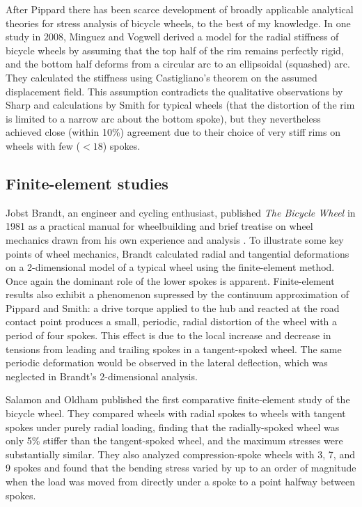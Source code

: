 \documentclass[../thesis.tex]{subfiles}
\begin{document}
After Pippard there has been scarce development of broadly applicable analytical theories for stress analysis of bicycle wheels, to the best of my knowledge. In one study in 2008, Minguez and Vogwell \cite{MinguezVogwell} derived a model for the radial stiffness of bicycle wheels by assuming that the top half of the rim remains perfectly rigid, and the bottom half deforms from a circular arc to an ellipsoidal (squashed) arc. They calculated the stiffness using Castigliano's theorem on the assumed displacement field. This assumption contradicts the qualitative observations by Sharp and calculations by Smith for typical wheels (that the distortion of the rim is limited to a narrow arc about the bottom spoke), but they nevertheless achieved close (within 10\%) agreement due to their choice of very stiff rims on wheels with few ($<18$) spokes.

\subsection{Finite-element studies}
Jobst Brandt, an engineer and cycling enthusiast, published \emph{The Bicycle Wheel} in 1981 as a practical manual for wheelbuilding and brief treatise on wheel mechanics drawn from his own experience and analysis \cite{Brandt}. To illustrate some key points of wheel mechanics, Brandt calculated radial and tangential deformations on a 2-dimensional model of a typical wheel using the finite-element method. Once again the dominant role of the lower spokes is apparent. Finite-element results also exhibit a phenomenon supressed by the continuum approximation of Pippard and Smith: a drive torque applied to the hub and reacted at the road contact point produces a small, periodic, radial distortion of the wheel with a period of four spokes. This effect is due to the local increase and decrease in tensions from leading and trailing spokes in a tangent-spoked wheel. The same periodic deformation would be observed in the lateral deflection, which was neglected in Brandt's 2-dimensional analysis.


Salamon and Oldham published the first comparative finite-element study of the bicycle wheel. They compared wheels with radial spokes to wheels with tangent spokes under purely radial loading, finding that the radially-spoked wheel was only 5\% stiffer than the tangent-spoked wheel, and the maximum stresses were substantially similar. They also analyzed compression-spoke wheels with 3, 7, and 9 spokes and found that the bending stress varied by up to an order of magnitude when the load was moved from directly under a spoke to a point halfway between spokes.
\end{document}
